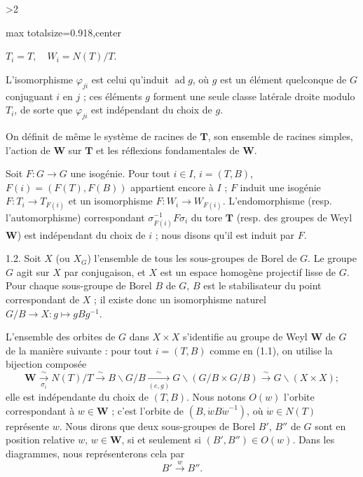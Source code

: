 \documentclass[9pt,twoside]{extarticle}
\newcommand{\EditionPage}[3]{%
  \ifnum#1>2\clearpage\fi
  \pdfbookmark[1]{Printed page #2}{fr-folio-#2}%
  \hypertarget{fr-physical-#1}{}%
  \noindent\begin{adjustbox}{max totalsize={\textwidth}{0.918\textheight},center}
  \begin{minipage}[t]{\textwidth}
  \fontsize{9.4}{11.1}\selectfont\justifying
  #3
  \end{minipage}
  \end{adjustbox}%
}
\begin{document}
\EditionPage{5}{106}{%
\(T_i=T,\quad W_i=N(T)/T.\)\par

L'isomorphisme \(\varphi_{ji}\) est celui qu'induit \(\operatorname{ad}g\), où \(g\) est un élément quelconque de \(G\) conjuguant \(i\) en \(j\) ; ces éléments \(g\) forment une seule classe latérale droite modulo \(T_i\), de sorte que \(\varphi_{ji}\) est indépendant du choix de \(g\).\par

On définit de même le système de racines de \(\mathbf{T}\), son ensemble de racines simples, l'action de \(\mathbf{W}\) sur \(\mathbf{T}\) et les réflexions fondamentales de \(\mathbf{W}\).\par

Soit \(F:G\to G\) une isogénie. Pour tout \(i\in I\), \(i=(T,B)\), \(F(i)=(F(T),F(B))\) appartient encore à \(I\) ; \(F\) induit une isogénie \(F:T_i\to T_{F(i)}\) et un isomorphisme \(F:W_i\to W_{F(i)}\). L'endomorphisme (resp. l'automorphisme) correspondant \(\sigma_{F(i)}^{-1}F\sigma_i\) du tore \(\mathbf{T}\) (resp. des groupes de Weyl \(\mathbf{W}\)) est indépendant du choix de \(i\) ; nous disons qu'il est induit par \(F\).\par

1.2. Soit \(X\) (ou \(X_G\)) l'ensemble de tous les sous-groupes de Borel de \(G\). Le groupe \(G\) agit sur \(X\) par conjugaison, et \(X\) est un espace homogène projectif lisse de \(G\). Pour chaque sous-groupe de Borel \(B\) de \(G\), \(B\) est le stabilisateur du point correspondant de \(X\) ; il existe donc un isomorphisme naturel \(G/B\to X:g\mapsto gBg^{-1}\).\par

L'ensemble des orbites de \(G\) dans \(X\times X\) s'identifie au groupe de Weyl \(\mathbf{W}\) de \(G\) de la manière suivante : pour tout \(i=(T,B)\) comme en (1.1), on utilise la bijection composée \[
\mathbf{W}\xrightarrow[\sigma_i]{\sim}N(T)/T\xrightarrow{\sim}B\backslash G/B\xrightarrow[(e,g)]{\sim}G\backslash(G/B\times G/B)\xrightarrow{\sim}G\backslash(X\times X) ;
\] elle est indépendante du choix de \((T,B)\). Nous notons \(O(w)\) l'orbite correspondant à \(w\in\mathbf{W}\) ; c'est l'orbite de \((B,\dot{w}B\dot{w}^{-1})\), où \(\dot{w}\in N(T)\) représente \(w\). Nous dirons que deux sous-groupes de Borel \(B'\), \(B''\) de \(G\) sont en position relative \(w\), \(w\in\mathbf{W}\), si et seulement si \((B',B'')\in O(w)\). Dans les diagrammes, nous représenterons cela par \[
B'\xrightarrow{w}B''.
\]\par

}
\end{document}
